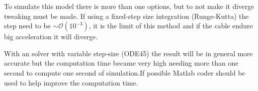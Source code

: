 To simulate this model there is more than one options, but to not make it diverge tweaking must be made.
If using a fixed-step size integration (Runge-Kutta) the step need to be $\sim\mathcal{O}(10^{-3})$, it is the limit of this method and if the cable endure big acceleration it will diverge.

With an solver with variable step-size (ODE45) the result will be in general more accurate but the computation time became very high needing more than one second to compute one second of simulation.If possible Matlab coder should be used to help improve the computation time.
